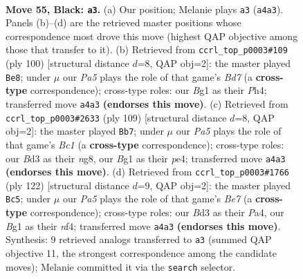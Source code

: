 \documentclass[11pt]{article}
\begin{document}
\clearpage

\begin{figure}[p]\centering
\begin{subfigure}{0.46\textwidth}\centering
\resizebox{\linewidth}{!}{%
\newchessgame
\chessboard[
  setfen={6K1/8/6p1/6k1/p7/3b4/8/6b1 b - - 1 55},
  showmover=false,
  pgfstyle=straightmove, color=movearrow, markmove={a4-a3}
]}
\caption{}
\end{subfigure}\hfill
\begin{subfigure}{0.46\textwidth}\centering
\resizebox{\linewidth}{!}{%
\newchessgame
\chessboard[
  setfen={8/3B4/5k2/8/7P/5K2/5P1b/8 w - - 13 51},
  showmover=false,
  pgfstyle=straightmove, color=movearrow, markmove={d7-e8}
]}
\caption{}
\end{subfigure}
\\[4pt]
\begin{subfigure}{0.46\textwidth}\centering
\resizebox{\linewidth}{!}{%
\newchessgame
\chessboard[
  setfen={2b3N1/8/8/7p/4P2k/8/5K2/8 b - - 7 55},
  showmover=false,
  pgfstyle=straightmove, color=movearrow, markmove={c8-b7}
]}
\caption{}
\end{subfigure}\hfill
\begin{subfigure}{0.46\textwidth}\centering
\resizebox{\linewidth}{!}{%
\newchessgame
\chessboard[
  setfen={8/4B3/2k5/8/P1K2n2/2P5/8/8 w - - 5 62},
  showmover=false,
  pgfstyle=straightmove, color=movearrow, markmove={e7-c5}
]}
\caption{}
\end{subfigure}
\caption{\textbf{Move 55, Black: \texttt{a3}.} (a) Our position; Melanie plays \texttt{a3} (\texttt{a4a3}). Panels (b)--(d) are the retrieved master positions whose correspondence most drove this move (highest QAP objective among those that transfer to it). (b) Retrieved from \texttt{ccrl\_top\_p0003\#109} (ply 100) [structural distance $d$=8, QAP obj=2]: the master played \texttt{Be8}; under $\mu$ our \emph{Pa5} plays the role of that game's \emph{Bd7} (a \textbf{cross-type} correspondence); cross-type roles: our \emph{B}g1 as their \emph{P}h4; transferred move \texttt{a4a3} \textbf{(endorses this move)}. (c) Retrieved from \texttt{ccrl\_top\_p0003\#2633} (ply 109) [structural distance $d$=8, QAP obj=2]: the master played \texttt{Bb7}; under $\mu$ our \emph{Pa5} plays the role of that game's \emph{Bc1} (a \textbf{cross-type} correspondence); cross-type roles: our \emph{B}d3 as their \emph{n}g8, our \emph{B}g1 as their \emph{p}e4; transferred move \texttt{a4a3} \textbf{(endorses this move)}. (d) Retrieved from \texttt{ccrl\_top\_p0003\#1766} (ply 122) [structural distance $d$=9, QAP obj=2]: the master played \texttt{Bc5}; under $\mu$ our \emph{Pa5} plays the role of that game's \emph{Be7} (a \textbf{cross-type} correspondence); cross-type roles: our \emph{B}d3 as their \emph{P}a4, our \emph{B}g1 as their \emph{n}f4; transferred move \texttt{a4a3} \textbf{(endorses this move)}. Synthesis: 9 retrieved analogs transferred to \texttt{a3} (summed QAP objective 11, the strongest correspondence among the candidate moves); Melanie committed it via the \texttt{search} selector.}
\label{fig:thought-m109}
\end{figure}
\end{document}
